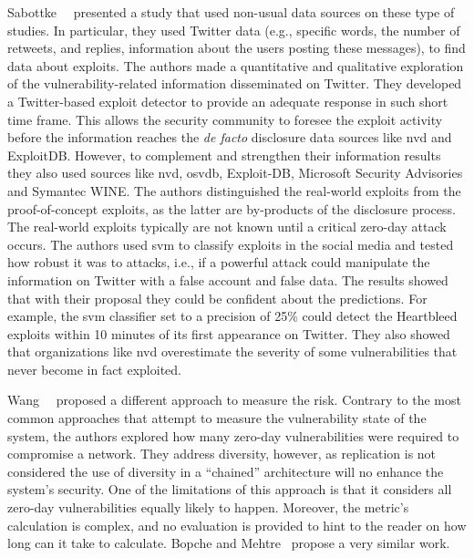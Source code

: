 Sabottke~\etal{}~\cite{Sabottke:2015} presented a study that used non-usual data sources on these type of studies.
In particular, they used Twitter data (e.g., specific words, the number of retweets, and replies, information about the users posting these messages), to find data about exploits. 
The authors made a quantitative and qualitative exploration of the vulnerability-related information disseminated on Twitter.
They developed a Twitter-based exploit detector to provide an adequate response in such short time frame. 
This allows the security community to foresee the exploit activity before the information reaches the \emph{de facto} disclosure data sources like \gls{nvd} and ExploitDB.
However, to complement and strengthen their information results they also used sources like \gls{nvd}, \gls{osvdb}, Exploit-DB, Microsoft Security Advisories and Symantec WINE. 
The authors distinguished the real-world exploits from the proof-of-concept exploits, as the latter are by-products of the disclosure process. 
The real-world exploits typically are not known until a critical zero-day attack occurs. 
The authors used \gls{svm} to classify exploits in the social media and tested how robust it was to attacks, i.e., if a powerful attack could manipulate the information on Twitter with a false account and false data. 
The results showed that with their proposal they could be confident about the predictions. 
For example, the \gls{svm} classifier set to a precision of 25\% could detect the Heartbleed exploits within 10 minutes of its first appearance on Twitter. 
They also showed that organizations like \gls{nvd} overestimate the severity of some vulnerabilities that never become in fact exploited.




Wang~\etal{}~\cite{Wang:2014} proposed a different approach to measure the risk. 
Contrary to the most common approaches that attempt to measure the vulnerability state of the system, the authors explored how many zero-day vulnerabilities were required to compromise a network. 
They address diversity, however, as replication is not considered the use of diversity in a ``chained'' architecture will no enhance the system's security.
One of the limitations of this approach is that it considers all zero-day vulnerabilities equally likely to happen.
Moreover, the metric's calculation is complex, and no evaluation is provided to hint to the reader on how long can it take to calculate.
Bopche and Mehtre~\cite{Bopche:2015} propose a very similar work.



